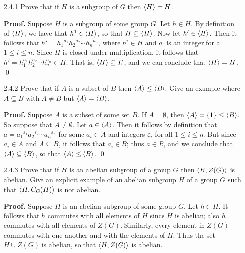 \begin{enumerate}
   \item[2.4.1]   Prove that if $H$ is a subgroup of $G$ then $\langle H \rangle = H$.

      \textbf{Proof.} Suppose $H$ is a subgroup of some group $G$. Let
      $h \in H$. By definition of $\langle H \rangle$, we have that $h^1 \in \langle H \rangle$, so
      that $H \subseteq \langle H \rangle$. Now let $h' \in \langle H \rangle$. Then it follows that
      $h' = {h_1}^{a_1}{h_2}^{a_2}\cdots {h_n}^{a_n}$, where $h^i \in H$ and
      $a_i$ is an integer for all $1 \le i \le n$. Since $H$ is closed under
      multiplication, it follows that
      $h' = h_1^{a_1}h_2^{a_2}\cdots h_n^{a_n} \in H$. That is, 
      $\langle H \rangle \subseteq H$, and we can conclude that $\langle H \rangle = H$. \qed
   \item[2.4.2]   Prove that if $A$ is a subset of $B$ then
                  $\langle A \rangle \le \langle B \rangle$. Give an example where $A \subseteq B$
                  with $A \neq B$ but $\langle A \rangle = \langle B \rangle$.

      \textbf{Proof.} Suppose $A$ is a subset of some set $B$. If
      $A = \emptyset$, then $\langle A \rangle = \{1\} \le \langle B \rangle$. So suppose that
      $A \neq \emptyset$. Let $a \in \langle A \rangle$. Then it follows by definition
      that $a = {a_1}^{\varepsilon_1}{a_2}^{\varepsilon_2}\cdots
      {a_n}^{\varepsilon_n}$ for some $a_i \in A$ and integers $\varepsilon_i$
      for all $1 \le i \le n$. But since $a_i \in A$ and $A \subseteq B$, it
      follows that $a_i \in B$; thus $a \in B$, and we conclude that
      $\langle A \rangle \subseteq \langle B \rangle$, so that $\langle A \rangle \le \langle B \rangle$. \qed
   \item[2.4.3]   Prove that if $H$ is an abelian subgroup of a group $G$ then
                  $\langle H, Z(G) \rangle$ is abelian. Give an explicit example of an
                  abelian subgroup $H$ of a group $G$ such that
                  $\langle H, C_G(H) \rangle$ is not abelian.

      \textbf{Proof.} Suppose $H$ is an abelian subgroup of some group $G$. Let
      $h \in H$. It follows that $h$ commutes with all elements of $H$ since
      $H$ is abelian; also $h$ commutes with all elements of $Z(G)$. Similarly,
      every element in $Z(G)$ commutes with one another and with the elements of
      $H$. Thus the set $H \cup Z(G)$ is abelian, so that $\langle H, Z(G) \rangle$ is
      abelian.


\end{enumerate}
